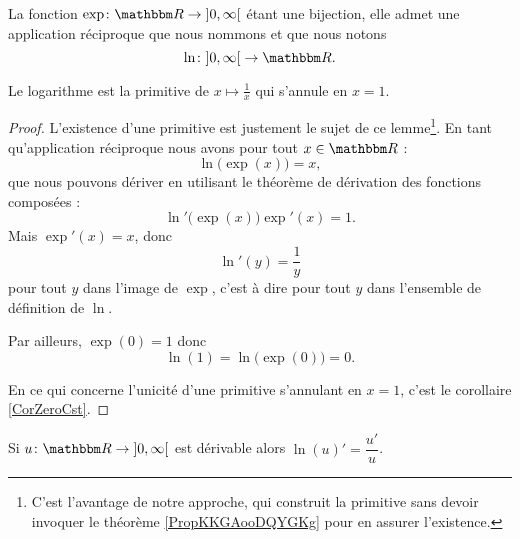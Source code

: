 \begin{definition}[Logarithme]  \label{DefDXPRooExiCpx}
    La fonction \( \exp\colon \eR\to \mathopen] 0 , \infty \mathclose[\) étant une bijection, elle admet une application réciproque que nous nommons  et que nous notons
\begin{equation}
    \ln\colon \mathopen] 0 , \infty \mathclose[\to \eR.
\end{equation}
\end{definition}

\begin{lemma}
    Le logarithme est la primitive de \( x\mapsto\frac{1}{ x }\) qui s'annule en \( x=1\).
\end{lemma}

\begin{proof}
    L'existence d'une primitive est justement le sujet de ce lemme\footnote{C'est l'avantage de notre approche, qui construit la primitive sans devoir invoquer le théorème \ref{PropKKGAooDQYGKg} pour en assurer l'existence.}. En tant qu'application réciproque nous avons pour tout \( x\in \eR\) :
    \begin{equation}
        \ln\big( \exp(x) \big)=x,
    \end{equation}
    que nous pouvons dériver en utilisant le théorème de dérivation des fonctions composées :
    \begin{equation}
        \ln'\big( \exp(x) \big)\exp'(x)=1.
    \end{equation}
    Mais \( \exp'(x)=x\), donc
    \begin{equation}
        \ln'(y)=\frac{1}{ y }
    \end{equation}
    pour tout \( y\) dans l'image de \( \exp\), c'est à dire pour tout \( y\) dans l'ensemble de définition de \( \ln\).

    Par ailleurs, \( \exp(0)=1\) donc
    \begin{equation}
        \ln(1)=\ln\big( \exp(0) \big)=0.
    \end{equation}

    En ce qui concerne l'unicité d'une primitive s'annulant en \( x=1\), c'est le corollaire \ref{CorZeroCst}.
\end{proof}

\begin{lemma}
Si \( u\colon \eR\to \mathopen] 0 , \infty \mathclose[\) est dérivable alors \( \ln(u)'=\dfrac{ u' }{ u }\).
\end{lemma}

